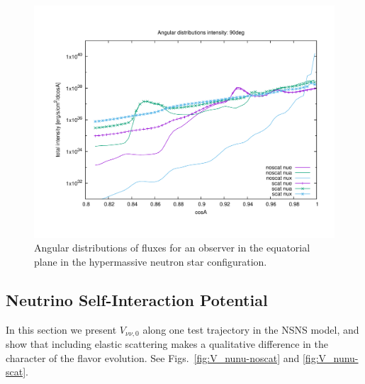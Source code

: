 \documentclass[aps,floatfix,prd,superscriptaddress,twocolumn]{revtex4-1}
\begin{document}
\begin{figure}
  \includegraphics[width=\columnwidth]{cosA_distrib-intensity-250km-90deg}
  \caption{Angular distributions of fluxes for an observer in the equatorial
    plane in the hypermassive neutron star configuration.}
  \label{fig:nsns_cosA_distrib_I_90deg}
\end{figure}

\subsection{Neutrino Self-Interaction Potential}
\label{ssec:V_nunu}
In this section we present $V_{\nu\nu,0}$ along one test trajectory in the NSNS
model, and show that including elastic scattering makes a qualitative
difference in the character of the flavor evolution.
See Figs.~\ref{fig:V_nunu-noscat} and \ref{fig:V_nunu-scat}.
\end{document}

